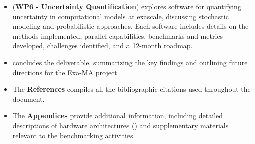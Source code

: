 \begin{itemize}
    \item {} (\textbf{WP6 - Uncertainty Quantification}) explores software for quantifying uncertainty in computational models at exascale, discussing stochastic modeling and probabilistic approaches. Each software includes details on the methods implemented, parallel capabilities, benchmarks and metrics developed, challenges identified, and a 12-month roadmap.
    \item {} concludes the deliverable, summarizing the key findings and outlining future directions for the Exa-MA project.
    \item The \textbf{References} compiles all the bibliographic citations used throughout the document.
    \item The \textbf{Appendices} provide additional information, including detailed descriptions of hardware architectures () and supplementary materials relevant to the benchmarking activities.
\end{itemize}
